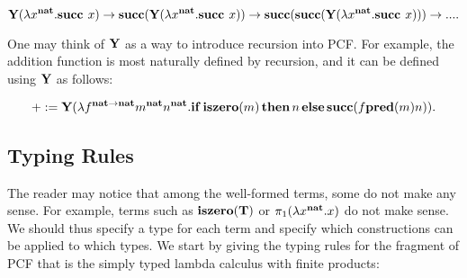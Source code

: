 
$$\textbf{Y}(\lambda x^{\textbf{nat}}. \textbf{succ } x) \to \textbf{succ}(\textbf{Y}(\lambda x^{\textbf{nat}}. \textbf{succ } x)) \to \textbf{succ}(\textbf{succ}(\textbf{Y}(\lambda x^{\textbf{nat}}. \textbf{succ } x))) \to ... .$$

One may think of $\textbf{Y}$ as a way to introduce recursion into PCF. For example, the addition function is most naturally defined by recursion, and it can be defined using $\textbf{Y}$ as follows:

\[ + := \textbf{Y}(\lambda f^{\mathbf{nat}\to\mathbf{nat}}m^\mathbf{nat}n^\mathbf{nat}.\mathbf{if}\,\mathbf{iszero}(m)\,\mathbf{then}\,n\,\mathbf{else }\,\mathbf{succ}(f \mathbf{pred}(m) n)). \]

\subsection{Typing Rules}

The reader may notice that among the well-formed terms, some do not make any sense. For example, terms such as $\mathbf{iszero}(\mathbf{T})$ or $\pi_1(\lambda x^\mathbf{nat}.x)$ do not make sense. We should thus specify a type for each term and specify which constructions can be applied to which types. We start by giving the typing rules for the fragment of PCF that is the simply typed lambda calculus with finite products:

